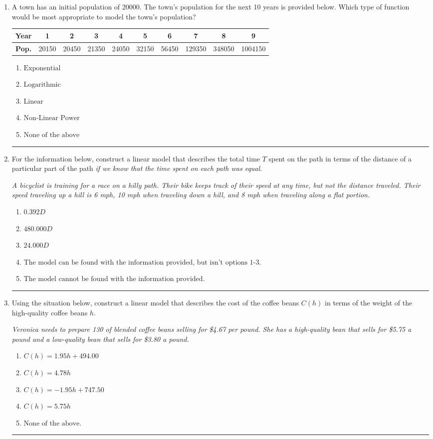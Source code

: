 \documentclass[14pt]{extbook}
\newcommand{\litem}[1]{\item#1\hspace*{-1cm}\rule{\textwidth}{0.4pt}}
\begin{document}
\begin{enumerate}
\litem{
A town has an initial population of 20000. The town's population for the next 10 years is provided below. Which type of function would be most appropriate to model the town's population?


\begin{tabular}{c|c|c|c|c|c|c|c|c|c}
\textbf{Year} & 1 & 2 & 3 & 4 & 5 & 6 & 7 & 8 & 9 \tabularnewline
\hline
\textbf{Pop.} & 20150 & 20450 & 21350 & 24050 & 32150 & 56450 & 129350 & 348050 & 1004150
\end{tabular} \begin{enumerate}[label=\Alph*.]
\item \( \text{Exponential} \)
\item \( \text{Logarithmic} \)
\item \( \text{Linear} \)
\item \( \text{Non-Linear Power} \)
\item \( \text{None of the above} \)

\end{enumerate} }
\litem{
For the information below, construct a linear model that describes the total time $T$ spent on the path in terms of the distance of a particular part of the path \textit{if we know that the time spent on each path was equal}.
\begin{center}
    \textit{ A bicyclist is training for a race on a hilly path. Their bike keeps track of their speed at any time, but not the distance traveled. Their speed traveling up a hill is 6 mph, 10 mph when traveling down a hill, and 8 mph when traveling along a flat portion. }
\end{center}
\begin{enumerate}[label=\Alph*.]
\item \( 0.392 D \)
\item \( 480.000 D \)
\item \( 24.000 D \)
\item \( \text{The model can be found with the information provided, but isn't options 1-3.} \)
\item \( \text{The model cannot be found with the information provided.} \)

\end{enumerate} }
\litem{
Using the situation below, construct a linear model that describes the cost of the coffee beans $C(h)$ in terms of the weight of the high-quality coffee beans $h$.
\begin{center}
    \textit{ Veronica needs to prepare 130 of blended coffee beans selling for \$4.67 per pound. She has a high-quality bean that sells for \$5.75 a pound and a low-quality bean that sells for \$3.80 a pound. }
\end{center}
\begin{enumerate}[label=\Alph*.]
\item \( C(h) = 1.95 h + 494.00 \)
\item \( C(h) = 4.78 h \)
\item \( C(h) = -1.95 h + 747.50 \)
\item \( C(h) = 5.75 h \)
\item \( \text{None of the above.} \)


\end{enumerate}}
\end{enumerate}
\end{document}
